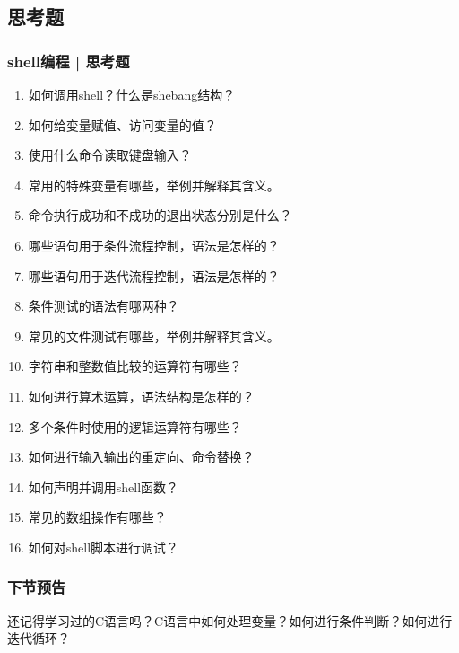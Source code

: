 \subsection{思考题}
\begin{frame}
  \frametitle{shell编程 | 思考题}
  \begin{enumerate}
    \item 如何调用shell？什么是shebang结构？
    \item 如何给变量赋值、访问变量的值？
    \item 使用什么命令读取键盘输入？
    \item 常用的特殊变量有哪些，举例并解释其含义。
    \item 命令执行成功和不成功的退出状态分别是什么？
    \item 哪些语句用于条件流程控制，语法是怎样的？
    \item 哪些语句用于迭代流程控制，语法是怎样的？
    \item 条件测试的语法有哪两种？
    \item 常见的文件测试有哪些，举例并解释其含义。
    \item 字符串和整数值比较的运算符有哪些？
    \item 如何进行算术运算，语法结构是怎样的？
    \item 多个条件时使用的逻辑运算符有哪些？
    \item 如何进行输入输出的重定向、命令替换？
    \item 如何声明并调用shell函数？
    \item 常见的数组操作有哪些？
    \item 如何对shell脚本进行调试？
  \end{enumerate}
\end{frame}


\begin{frame}
  \frametitle{下节预告}
  还记得学习过的C语言吗？C语言中如何处理变量？如何进行条件判断？如何进行迭代循环？
\end{frame}



